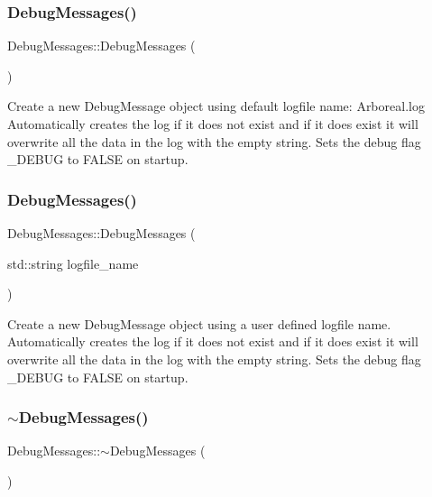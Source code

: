 \subsubsection{\texorpdfstring{Debug\+Messages()}{DebugMessages()}\hspace{0.1cm}{\footnotesize\ttfamily [1/2]}}
{\footnotesize\ttfamily Debug\+Messages\+::\+Debug\+Messages (\begin{DoxyParamCaption}{ }\end{DoxyParamCaption})\hspace{0.3cm}{\ttfamily [inline]}}

Create a new Debug\+Message object using default logfile name\+: \textquotesingle{}Arboreal.\+log\textquotesingle{} Automatically creates the log if it does not exist and if it does exist it will overwrite all the data in the log with the empty string. Sets the debug flag \+\_\+\+D\+E\+B\+UG to F\+A\+L\+SE on startup. \mbox{\label{classDebugMessages_aa60430ca0e05e43a8bb27f4cdc1a158c}} 
\subsubsection{\texorpdfstring{Debug\+Messages()}{DebugMessages()}\hspace{0.1cm}{\footnotesize\ttfamily [2/2]}}
{\footnotesize\ttfamily Debug\+Messages\+::\+Debug\+Messages (\begin{DoxyParamCaption}\item[{std\+::string}]{logfile\+\_\+name }\end{DoxyParamCaption})\hspace{0.3cm}{\ttfamily [inline]}}

Create a new Debug\+Message object using a user defined logfile name. Automatically creates the log if it does not exist and if it does exist it will overwrite all the data in the log with the empty string. Sets the debug flag \+\_\+\+D\+E\+B\+UG to F\+A\+L\+SE on startup. \mbox{\label{classDebugMessages_a3700e476ad70d27ba14be67b43ff6f69}} 
\subsubsection{\texorpdfstring{$\sim$\+Debug\+Messages()}{~DebugMessages()}}
{\footnotesize\ttfamily Debug\+Messages\+::$\sim$\+Debug\+Messages (\begin{DoxyParamCaption}{ }\end{DoxyParamCaption})\hspace{0.3cm}{\ttfamily [inline]}}


